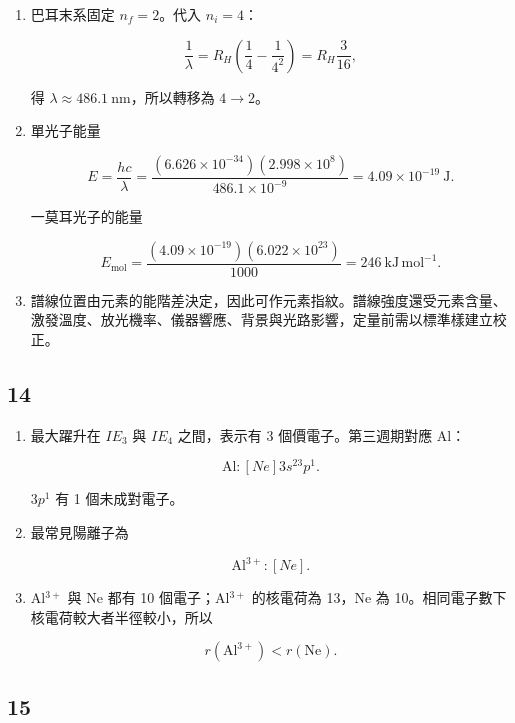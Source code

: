 \documentclass[11pt,a4paper]{article}
\begin{document}
\begin{enumerate}
\def\labelenumi{\arabic{enumi}.}
\item
  巴耳末系固定 \(n_f=2\)。代入 \(n_i=4\)：

  \[
  \frac1\lambda
  =R_H\left(\frac14-\frac1{4^2}\right)
  =R_H\frac3{16},
  \]

  得 \(\lambda\approx486.1\ \mathrm{nm}\)，所以轉移為 \(4\to2\)。
\item
  單光子能量

  \[
  E=\frac{hc}{\lambda}
  =\frac{(6.626\times10^{-34})(2.998\times10^8)}
  {486.1\times10^{-9}}
  =4.09\times10^{-19}\ \mathrm J.
  \]

  一莫耳光子的能量

  \[
  E_{\mathrm{mol}}
  =\frac{(4.09\times10^{-19})(6.022\times10^{23})}{1000}
  =246\ \mathrm{kJ\,mol^{-1}}.
  \]
\item
  譜線位置由元素的能階差決定，因此可作元素指紋。譜線強度還受元素含量、激發溫度、放光機率、儀器響應、背景與光路影響，定量前需以標準樣建立校正。
\end{enumerate}

\subsection{14}\label{section-13}

\begin{enumerate}
\def\labelenumi{\arabic{enumi}.}
\item
  最大躍升在 \(IE_3\) 與 \(IE_4\) 之間，表示有 3 個價電子。第三週期對應 Al：

  \[
  \mathrm{Al}:[Ne]3s^23p^1.
  \]

  \(3p^1\) 有 1 個未成對電子。
\item
  最常見陽離子為

  \[
  \mathrm{Al^{3+}}:[Ne].
  \]
\item
  Al\(^{3+}\) 與 Ne 都有 10 個電子；Al\(^{3+}\) 的核電荷為 13，Ne 為 10。相同電子數下核電荷較大者半徑較小，所以

  \[
  r(\mathrm{Al^{3+}})<r(\mathrm{Ne}).
  \]
\end{enumerate}

\subsection{15}\label{section-14}
\end{document}

